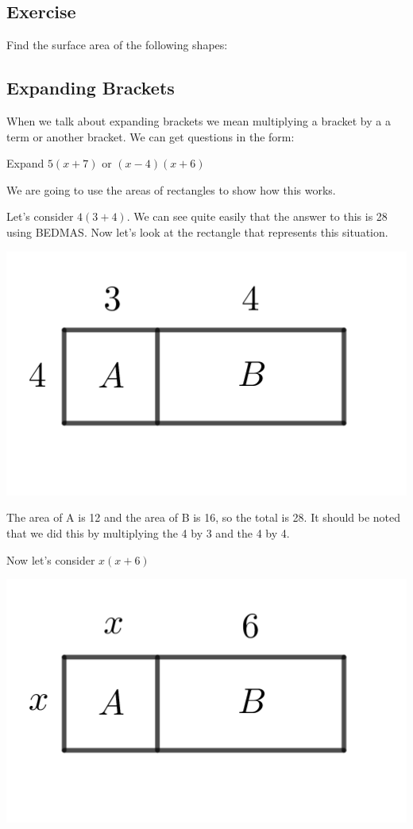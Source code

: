 \subsection{Exercise}
Find the surface area of the following shapes:

\subsection{Expanding Brackets}
When we talk about expanding brackets we mean multiplying a bracket by a a term or another bracket.  We can get questions in the form:

Expand $5(x+7)$  or $(x-4)(x+6)$

We are going to use the areas of rectangles to show how this works.

Let's consider $4(3+4)$.  We can see quite easily that the answer to this is 28 using BEDMAS.  Now let's look at the rectangle that represents this situation.

\bigskip

\includegraphics{./Images/Measurement/ExpandBrackets1.png}

\bigskip

The area of A is 12 and the area of B is 16, so the total is 28.  It should be noted that we did this by multiplying the 4 by 3 and the 4 by 4.

\bigskip

Now let's consider $x(x+6)$

\bigskip

\includegraphics{./Images/Measurement/ExpandBrackets2.png}

